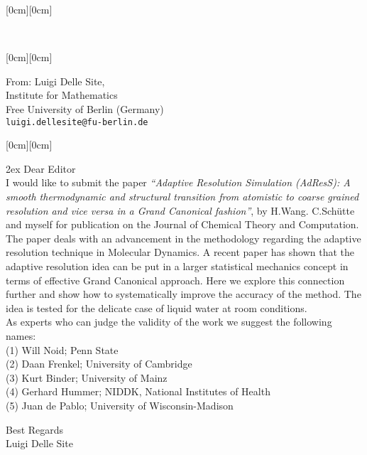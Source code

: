 \documentclass[12pt]{article}
\newcommand{\kopf}{\noindent
\raisebox{2.5cm}[0cm][0cm]
{
\parbox[c]{0.88\textwidth}
{
\begin{center}
\textsc{}\\
\textsc{}
\end{center}
}
}
}
\begin{document}
\kopf



\hfill\raisebox{1.5cm}[0cm][0cm] {\parbox[t]{0.34\textwidth}
{From: Luigi Delle Site,\\
Institute for Mathematics\\
Free University of Berlin (Germany)\\
{\tt\small luigi.dellesite@fu-berlin.de}\\
}}

\noindent\raisebox{1.8cm}[0cm][0cm]
{}

\vspace{3cm}



\vspace{2cm}

\parskip 2ex
Dear Editor\\
I would like to submit the paper {\it ``Adaptive Resolution Simulation (AdResS): A smooth thermodynamic and structural transition from atomistic to coarse grained resolution and vice versa in a Grand Canonical fashion''}, by H.Wang. C.Sch\"{u}tte and myself for publication on the Journal of Chemical Theory and Computation.
The paper deals with an advancement in the methodology regarding the adaptive resolution technique in Molecular Dynamics. A recent paper has shown that the adaptive resolution idea can be put in a larger statistical mechanics concept in terms of effective Grand Canonical approach. Here we explore this connection further and show how to systematically improve the accuracy of the method. The idea is tested for the delicate case of liquid water at room conditions.\\
As experts who can judge the validity of the work we suggest the following names:\\
(1) Will Noid; Penn State\\
(2) Daan Frenkel; University of Cambridge\\
(3) Kurt Binder; University of Mainz\\
(4) Gerhard Hummer; NIDDK, National Institutes of Health\\
(5) Juan de Pablo;  University of Wisconsin-Madison 



Best Regards\\
Luigi Delle Site\\
\end{document}

